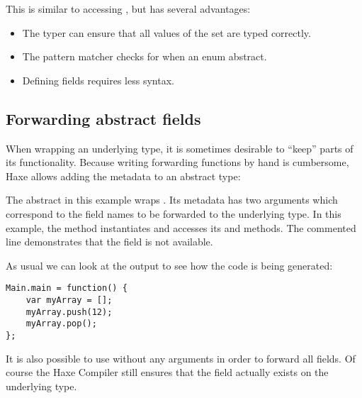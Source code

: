 This is similar to accessing , but has several advantages:

\begin{itemize}
	\item The typer can ensure that all values of the set are typed correctly.
	\item The pattern matcher checks for  when  an enum abstract.
	\item Defining fields requires less syntax.
\end{itemize}


\subsection{Forwarding abstract fields}
\label{types-abstract-forward}

When wrapping an underlying type, it is sometimes desirable to ``keep'' parts of its functionality. Because writing forwarding functions by hand is cumbersome, Haxe allows adding the  metadata to an abstract type:


The  abstract in this example wraps . Its  metadata has two arguments which correspond to the field names to be forwarded to the underlying type. In this example, the  method instantiates  and accesses its  and  methods. The commented line demonstrates that the  field is not available.

As usual we can look at the  output to see how the code is being generated:

\begin{lstlisting}
Main.main = function() {
	var myArray = [];
	myArray.push(12);
	myArray.pop();
};
\end{lstlisting}

It is also possible to use  without any arguments in order to forward all fields. Of course the Haxe Compiler still ensures that the field actually exists on the underlying type.



